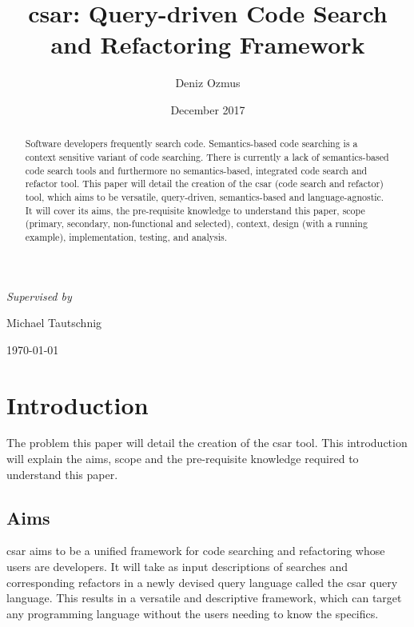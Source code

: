 \documentclass[12pt, letterpaper]{article}
\title{csar: Query-driven Code Search and Refactoring Framework}
\author{Deniz Ozmus}
\date{December 2017}
\def \supervisor {Michael Tautschnig}
\begin{document}
\nocite{*}

\begin{titlepage}
  \centering
  {\Large \MyTitle\par}
  \vspace{3cm}
  {\MyAuthor\par}
  \vspace{0.5cm}
  {\itshape Supervised by }{ \supervisor\par}
  \vspace{13cm}
  {\today\par}
\end{titlepage}

\begin{abstract}
  Software developers frequently search code.
  Semantics-based code searching is a context sensitive variant of code searching.
  There is currently a lack of semantics-based code search tools and furthermore no semantics-based, integrated code search and refactor tool.
  This paper will detail the creation of the csar (code search and refactor) tool, which aims to be versatile, query-driven, semantics-based and language-agnostic.
  It will cover its aims, the pre-requisite knowledge to understand this paper, scope (primary, secondary, non-functional and selected), context, design (with a running example), implementation, testing, and analysis.
\end{abstract}
\newpage

\tableofcontents
\newpage

\section{Introduction}
The problem this paper will detail the creation of the csar tool.
This introduction will explain the aims, scope and the pre-requisite knowledge required to understand this paper.

\subsection{Aims}
csar aims to be a unified framework for code searching and refactoring whose users are developers.
It will take as input descriptions of searches and corresponding refactors in a newly devised query language called the csar query language.
This results in a versatile and descriptive framework, which can target any programming language without the users needing to know the specifics.
\end{document}

